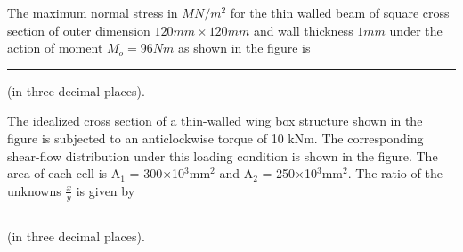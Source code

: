 \iffalse
    \title{Assignment}
    \author{EE24BTECH11009}
    \section{ae}
    \chapter{2017}
  \fi
\item The maximum normal stress in $MN/m^2$ for the thin walled beam of square cross section of outer dimension $120 mm \times 120 mm$ and wall thickness $1 mm$ under the action of moment $M_o=96 Nm$ as shown in the figure is \rule{2cm}{0.15mm} (in three decimal places).
\begin{figure}[H]
\centering
{}%

\label{fig:my_label}
\end{figure}
\item The idealized cross section of a thin-walled wing box structure shown in the figure is subjected to an anticlockwise torque of 10 kNm. The corresponding shear-flow distribution under this loading condition is shown in the figure. The area of each cell is A$_1$ = 300$\times$10$^3$mm$^2$ and A$_2$ = 250$\times$10$^3$mm$^2$. The ratio of the unknowns $\frac{x}{y}$ is given by \rule{2cm}{0.15mm} (in three decimal places).
